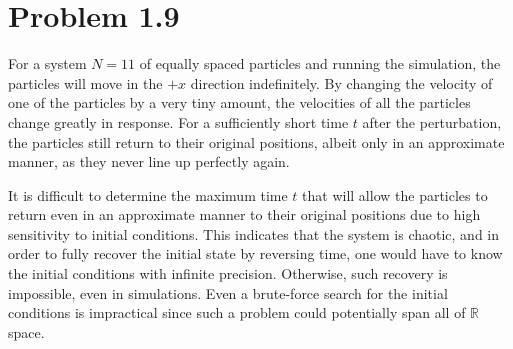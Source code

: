 \documentclass[12pt,a4paper]{article}
\begin{document}
\setcounter{page}{1}

\section*{Problem 1.9}
\bigskip

For a system $N = 11$ of equally spaced particles and running the simulation, the particles will move in the $+x$ direction indefinitely. By changing the velocity of one of the particles by a very tiny amount, the velocities of all the particles change greatly in response. For a sufficiently short time $t$ after the perturbation, the particles still return to their original positions, albeit only in an approximate manner, as they never line up perfectly again.

It is difficult to determine the maximum time $t$ that will allow the particles to return even in an approximate manner to their original positions due to high sensitivity to initial conditions. This indicates that the system is chaotic, and in order to fully recover the initial state by reversing time, one would have to know the initial conditions with infinite precision. Otherwise, such recovery is impossible, even in simulations. Even a brute-force search for the initial conditions is impractical since such a problem could potentially span all of $\mathbb{R}$ space.
\end{document}
